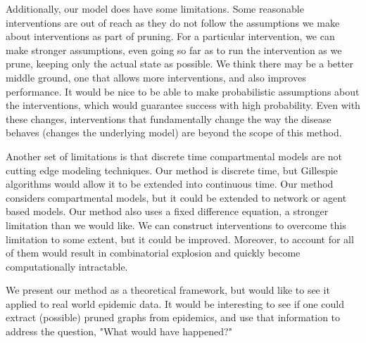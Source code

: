 \documentclass[openacc]{rsproca_new}%
\begin{document}
Additionally, our model does have some limitations.
Some reasonable interventions are out of reach as they do not follow the assumptions we make about interventions as part of pruning.
For a particular intervention, we can make stronger assumptions, even going so far as to run the intervention as we prune, keeping only the actual state as possible.
We think there may be a better middle ground, one that allows more interventions, and also improves performance.
It would be nice to be able to make probabilistic assumptions about the interventions, which would guarantee success with high probability.
Even with these changes, interventions that fundamentally change the way the disease behaves (changes the underlying model) are beyond the scope of this method.

Another set of limitations is that discrete time compartmental models are not cutting edge modeling techniques.
Our method is discrete time, but Gillespie algorithms would allow it to be extended into continuous time.
Our method considers compartmental models, but it could be extended to network or agent based models.
Our method also uses a fixed difference equation, a stronger limitation than we would like.
We can construct interventions to overcome this limitation to some extent, but it could be improved.
Moreover, to account for all of them would result in  combinatorial explosion and quickly become computationally intractable. %

We present our method as a theoretical framework, but would like to see it applied to real world epidemic data.
It would be interesting to see if one could extract (possible) pruned graphs from epidemics, and use that information to address the question, "What would have happened?"

\enlargethispage{20pt}











\end{document}
